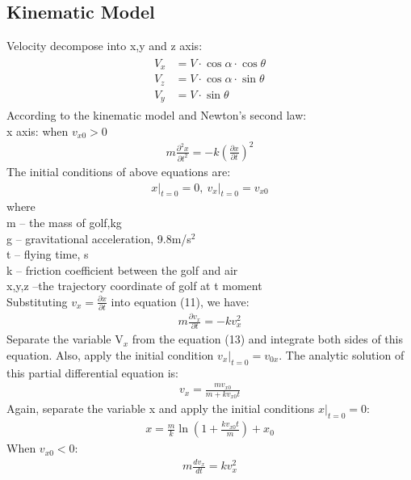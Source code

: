 \subsection{Kinematic Model}
Velocity decompose into x,y and z axis:
\begin{align}
\begin{split}
    V_{x}&=V \cdot \cos \alpha \cdot \cos \theta\\
    V_{z}&=V \cdot \cos \alpha \cdot \sin \theta\\
    V_{y}&=V \cdot \sin \theta    
\end{split}
\end{align}
According to the kinematic model and Newton’s second law:\\
x axis:
when $v_{x 0}>0$
\begin{align}
    m \frac{\partial^{2} x}{\partial t^{2}}=-k\left(\frac{\partial x}{\partial t}\right)^{2}
\end{align}
The initial conditions of above equations are:
\begin{align}
    \left.x\right|_{t=0}=0,\ \left.v_{x}\right|_{t=0}=v_{x 0}
\end{align}
where\\
m -- the mass of golf,kg\\
g -- gravitational acceleration, 9.8m/s$^2$\\
t -- flying time, s\\
k -- friction coefficient between the golf and air\\
x,y,z --the trajectory coordinate of golf at t moment \\
Substituting $v_{x}=\frac{\partial x}{\partial t}$ into equation (11), we have:
\begin{align}
    m \frac{\partial v_{x}}{\partial t}=-k v_{x}^{2}
\end{align}
Separate the variable V$_x$ from the equation (13) and integrate both sides of this equation. Also, apply the initial condition $\left.v_{x}\right|_{t=0}=v_{0 x}$. The analytic solution of this partial differential equation is:
\begin{align}
    v_{x}=\frac{m v_{x 0}}{m+k v_{x 0} t}
\end{align}
Again, separate the variable x and apply the initial conditions $\left.x\right|_{t=0}=0$:
\begin{align}
    x=\frac{m}{k} \ln \left(1+\frac{k v_{x 0} t}{m}\right)+x_{0}
\end{align}
When $v_{x 0}<0$:
\begin{align}
    m \frac{d v_{x}}{d t}=k v_{x}^{2}
\end{align}
